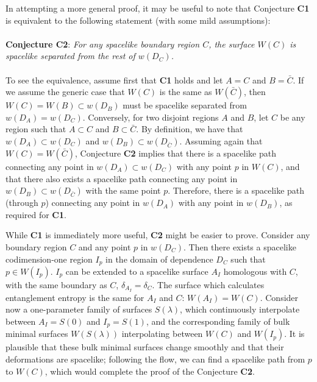\documentclass[12pt]{article}
\renewcommand{\(}{\left(}
\renewcommand{\)}{\right)}
\begin{document}
In attempting a more general proof, it may be useful to note that Conjecture {\bf {C1}} is equivalent to the following statement (with some mild assumptions):
\\
\\
{\bf{Conjecture C2}}: {\it For any spacelike boundary region $C$, the surface $W(C)$ is spacelike separated from the rest of $w(D_C)$.}
\\
\\
To see the equivalence, assume first that {\bf {C1}} holds and let $A=C$ and $B=\bar C$.  If we assume
the generic case that $W(C)$ is the same as $W(\bar C)$, then $W(C) =
W(B) \subset w(D_B)$ must be spacelike separated from $w(D_A)=w(D_C)$.
Conversely, for two disjoint regions $A$ and $B$, let $C$ be any region such
that $A \subset C$ and $B \subset \bar C$.  By definition, we have
that  $w(D_A)\subset w(D_C)$ and  $w(D_B)\subset w(D_{\bar C})$.
Assuming again that  $W(C) = W(\bar C)$, Conjecture {\bf {C2}}
implies that there is a spacelike path connecting any point
in $w(D_A)\subset w(D_C)$ with any point $p$ in $W(C)$,
and that there also exists a spacelike path connecting any point
in $w(D_B)\subset w(D_{\bar C})$ with the same point $p$.
Therefore, there is a spacelike path (through $p$) connecting any point in
$w(D_A)$ with any point in $w(D_B)$, as required for {\bf {C1}}.


While {\bf {C1}} is immediately more useful,  {\bf {C2}}  might be
easier to prove.  Consider any boundary region $C$ and any point
$p$ in $w(D_C)$.  Then there exists a spacelike
codimension-one region $I_p$ in the domain of dependence $D_C$
such that $p \in W(I_p)$.  $I_p$ can be extended to
a spacelike surface $A_I$ homologous with $C$, with the same boundary
as $C$, $\delta_{A_I} = \delta_C$.  The surface which calculates
entanglement entropy is the same for $A_I$ and $C$: $W(A_I)=W(C)$.
Consider now a one-parameter family of surfaces $S(\lambda)$, which continuously
interpolate between $A_I=S(0)$ and $I_p=S(1)$, and the corresponding
family of bulk minimal surfaces $W(S(\lambda))$ interpolating between
$W(C)$ and $W(I_p)$.  It is plausible that these bulk minimal surfaces
change smoothly and that their deformations are spacelike;
following the flow, we can find a
spacelike path from $p$ to $W(C)$, which would complete the proof
of the Conjecture  {\bf {C2}}.
\end{document}
